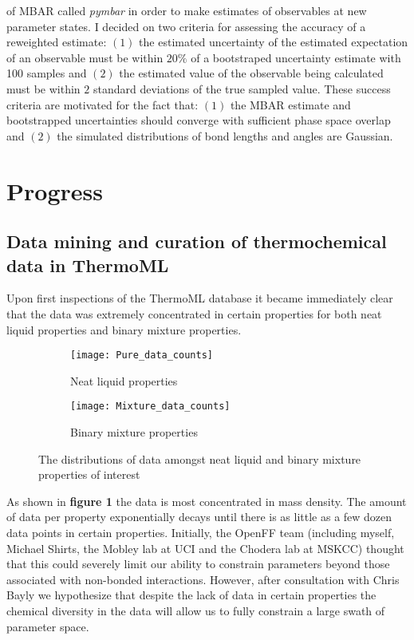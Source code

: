 \documentclass[rmp,nofootinbib,superscriptaddress,12pt,tightenlines,notitlepage]{revtex4-1}
\begin{document}
of MBAR called \textit{pymbar} in order to make estimates of observables at new parameter states. I decided on two criteria for assessing the accuracy
of a reweighted estimate: $\left(1\right)$ the estimated uncertainty of the estimated expectation of an observable must be within $20 \%$ of a bootstraped uncertainty estimate with 100 samples and $\left(2\right)$ the estimated value of the observable being calculated must be within $2$ standard deviations of the true
sampled value. These success criteria are motivated for the fact that: $\left(1\right)$ the MBAR estimate and bootstrapped uncertainties should converge with 
sufficient phase space overlap and $\left(2\right)$ the simulated distributions of bond lengths and angles are Gaussian. 
\section{Progress}
\subsection{Data mining and curation of thermochemical data in ThermoML}
Upon first inspections of the ThermoML database it became immediately clear that the data was extremely concentrated in certain properties for both 
neat liquid properties and binary mixture properties. 
\begin{figure}[h!]
\centering
\begin{subfigure}{.5\textwidth}
  \centering
  \texttt{[image: Pure\_data\_counts]}
  \caption{Neat liquid properties}
  \label{fig:sub1}
\end{subfigure}%
\begin{subfigure}{.5\textwidth}
  \centering
  \texttt{[image: Mixture\_data\_counts]}
  \caption{Binary mixture properties}
  \label{fig:sub2}
\end{subfigure}
\caption{The distributions of data amongst neat liquid and binary mixture properties of interest}
\label{fig:test}
\end{figure}
As shown in \textbf{figure 1} the data is most concentrated in mass density. The amount of data per property exponentially decays
until there is as little as a few dozen data points in certain properties. Initially, the OpenFF team (including myself, Michael Shirts, the 
Mobley lab at UCI and the Chodera lab at MSKCC) thought that this could severely limit our ability to constrain parameters beyond those 
associated with non-bonded interactions. However, after consultation with Chris Bayly we hypothesize that despite the lack of data in certain properties
the chemical diversity in the data will allow us to fully constrain a large swath of parameter space.
\end{document}
